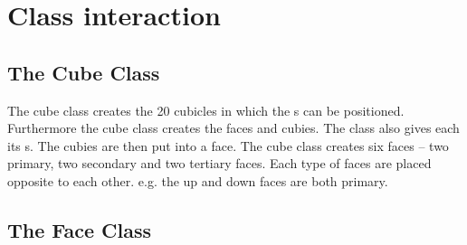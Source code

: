 \section{Class interaction}
\myTop{}
\subsection{The Cube Class}
The cube class creates the 20 cubicles in which the \cpiece{}s can be positioned. Furthermore the cube class creates the faces and cubies. The class also gives each \cpiece{} its \facelet{}s. The cubies are then put into a face. The cube class creates six faces -- two primary, two secondary and two tertiary faces. Each type of faces are placed opposite to each other. e.g. the up and down faces are both primary.
\subsection{The Face Class}
















\myTail{}